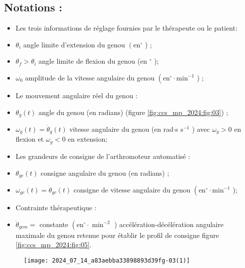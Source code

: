 \subsection*{Notations :}
\begin{itemize}
  \item Les trois informations de réglage fournies par le thérapeute ou le patient:

  \item $\theta_{i}$ angle limite d'extension du genou $\left(\mathrm{en}^{\circ}\right.$ ) ;

  \item $\theta_{f}>\theta_{i}$ angle limite de flexion du genou (en ${ }^{\circ}$ );

  \item $\omega_{0}$ amplitude de la vitesse angulaire du genou $\left(\mathrm{en}^{\circ} \cdot \mathrm{min}^{-1}\right.$ ) ;

  \item Le mouvement angulaire réel du genou :

  \item $\theta_{g}(t)$ angle du genou (en radians) (figure \ref{fig:ccs_mp_2024:fig:03}) ;

  \item $\omega_{g}(t)=\dot{\theta}_{g}(t)$ vitesse angulaire du genou (en rad$\cdot$s $\mathrm{s}^{-1}$ ) avec $\omega_{g}>0$ en flexion et $\omega_{g}<0$ en extension;

  \item Les grandeurs de consigne de l'arthromoteur automatisé :

  \item $\theta_{g c}(t)$ consigne angulaire du genou (en radians) ;

  \item $\omega_{g c}(t)=\dot{\theta}_{g c}(t)$ consigne de vitesse angulaire du genou $\left(\mathrm{en}^{\circ} \cdot \mathrm{min}^{-1}\right.$ );

  \item Contrainte thérapeutique :

  \item $\ddot{\theta}_{g c m}=$ constante $\left(\mathrm{en}^{\circ} \cdot \min ^{-2}\right.$ ) accélération-décélération angulaire maximale du genou retenue pour établir le profil de consigne figure \ref{fig:ccs_mp_2024:fig:05}.

\end{itemize}

\begin{figure}[!h]
\centering
\texttt{[image: 2024\_07\_14\_a83aebba33898893d39fg-03(1)]}
\end{figure}

